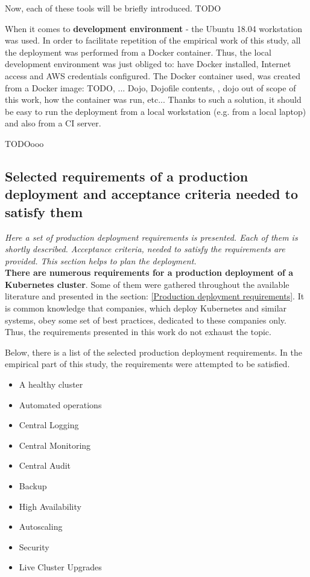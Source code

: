 Now, each of these tools will be briefly introduced. TODO

When it comes to \textbf{development environment} - the Ubuntu 18.04 workstation was used. In order to facilitate repetition of the empirical work of this study, all the deployment was performed from a Docker container. Thus, the local development environment was just obliged to: have Docker installed, Internet access and AWS credentials configured. The Docker container used, was created from a Docker image: TODO, ... Dojo, Dojofile contents, , dojo out of scope of this work, how the container was run, etc... Thanks to such a solution, it should be easy to run the deployment from a local workstation (e.g. from a local laptop) and also from a CI server.

TODOooo


\subsection{Selected requirements of a production deployment and acceptance criteria needed to satisfy them}
\textit{Here a set of production deployment requirements is presented. Each of them is shortly described. Acceptance criteria, needed to satisfy the requirements are provided. This section helps to plan the deployment.}
\\

\textbf{There are numerous requirements for a production deployment of a Kubernetes cluster}. Some of them were gathered throughout the available literature and presented in the section: \ref{Production deployment requirements}. It is common knowledge that companies, which deploy Kubernetes and similar systems, obey some set of best practices, dedicated to these companies only. Thus, the requirements presented in this work do not exhaust the topic.

Below, there is a list of the selected production deployment requirements. In the empirical part of this study, the requirements were  attempted to be satisfied.
\begin{itemize}
\item A healthy cluster
\item Automated operations
\item Central Logging
\item Central Monitoring
\item Central Audit
\item Backup
\item High Availability
\item Autoscaling
\item Security
\item Live Cluster Upgrades
\end{itemize}

